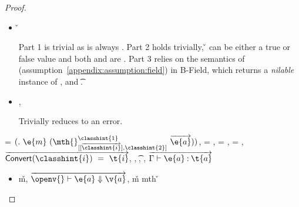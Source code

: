 \begin{lemma}
\begin{proof}
\begin{case}[T-FieldStatic]
\begin{itemize}
  \item[]
\begin{subcase}[B-Field]
  \opsem {\openv{}}
         {} 
         { {\classfieldpair{\fld{}} {\v{}}}}


Part 1 is trivial as \object{} is always \emptyobject{}.
Part 2 holds trivially, \v{} can be either a true or false value
and both {\thenprop{\prop{}}} and {\elseprop{\prop{}}}
are \topprop{}.
Part 3 relies on the semantics of \getfieldliteral (assumption~\ref{appendix:assumption:field})
in B-Field, which returns a \emph{nilable} instance of ,
and  {\t{}}.
\end{subcase}
  \item[]
\begin{subcase}[BE-Field]
  \opsem {\openv{}}
         {} 
         {\errorvalv{}},
  \opsem {\openv{}}
         {\e{}}
         {\errorvalv{}}

         Trivially reduces to an error.

\end{subcase}

\end{itemize}
\end{case}

\begin{case}[T-MethodStatic]
  \e{} = ${\methodstaticexp {\classhint{1}} 
                          {\overrightarrow {\classhint{i}}} 
                          {\classhint{2}}
                          {\mth{}} {\e{m}} {\overrightarrow{\e{a}}}}$,
  \thenprop{\prop{}} = \topprop{}, \elseprop{\prop{}} = \topprop{}, \object{} = \emptyobject{},
  $\overrightarrow{\javatotc {\classhint{i}} {\t{i}}}$,
              {\class{}},
              {\t{}},
  \judgementtwo {\propenv{}} { {\class{}}},
             $\overrightarrow{
  \judgementtwo {\propenv{}} {\hastype {\e{a}} {\t{a}}}
                  }$

\begin{itemize}
  \item[]
\begin{subcase}[B-Method]
  \opsem {\openv{}}
         {}
         {\v{m}},
  $\overrightarrow{
  \opsem {\openv{}}
         {\e{a}}
         {\v{a}}}$,
   {\v{m}} {mth}
                    {} {}
                    {}
                    {\v{}}



\end{subcase}
\end{itemize}
\end{case}
\end{proof}
\end{lemma}
